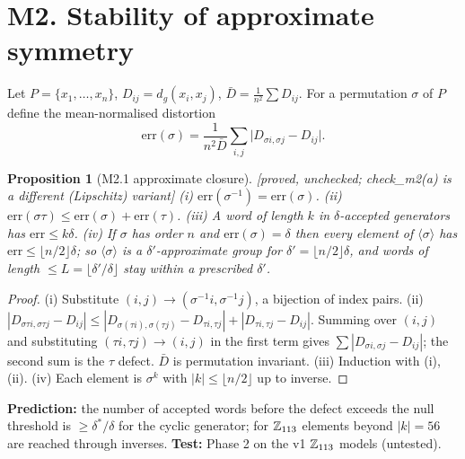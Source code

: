 \documentclass[11pt]{article}
\newtheorem{prop}{Proposition}
\theoremstyle{remark}\newtheorem{rem}{Remark}
\newcommand{\status}[1]{\hfill\textsf{[#1]}}
\begin{document}
\section*{M2. Stability of approximate symmetry}
Let $P=\{x_1,\dots,x_n\}$, $D_{ij}=d_g(x_i,x_j)$, $\bar D=\frac1{n^2}\sum D_{ij}$. For a permutation $\sigma$ of $P$ define the mean-normalised distortion
\[ \mathrm{err}(\sigma)=\frac{1}{n^2\bar D}\sum_{i,j}\bigl|D_{\sigma i,\sigma j}-D_{ij}\bigr|. \]
\begin{prop}[M2.1 approximate closure]\status{proved, unchecked; check\_m2(a) is a different (Lipschitz) variant}
(i) $\mathrm{err}(\sigma^{-1})=\mathrm{err}(\sigma)$. (ii) $\mathrm{err}(\sigma\tau)\le\mathrm{err}(\sigma)+\mathrm{err}(\tau)$. (iii) A word of length $k$ in $\delta$-accepted generators has $\mathrm{err}\le k\delta$. (iv) If $\sigma$ has order $n$ and $\mathrm{err}(\sigma)=\delta$ then every element of $\langle\sigma\rangle$ has $\mathrm{err}\le\lfloor n/2\rfloor\delta$; so $\langle\sigma\rangle$ is a $\delta'$-approximate group for $\delta'=\lfloor n/2\rfloor\delta$, and words of length $\le L=\lfloor\delta'/\delta\rfloor$ stay within a prescribed $\delta'$.
\end{prop}
\begin{proof}
(i) Substitute $(i,j)\to(\sigma^{-1}i,\sigma^{-1}j)$, a bijection of index pairs. (ii) $|D_{\sigma\tau i,\sigma\tau j}-D_{ij}|\le|D_{\sigma(\tau i),\sigma(\tau j)}-D_{\tau i,\tau j}|+|D_{\tau i,\tau j}-D_{ij}|$. Summing over $(i,j)$ and substituting $(\tau i,\tau j)\to(i,j)$ in the first term gives $\sum|D_{\sigma i,\sigma j}-D_{ij}|$; the second sum is the $\tau$ defect. $\bar D$ is permutation invariant. (iii) Induction with (i),(ii). (iv) Each element is $\sigma^k$ with $|k|\le\lfloor n/2\rfloor$ up to inverse. \qedhere
\end{proof}
\textbf{Prediction:} the number of accepted words before the defect exceeds the null threshold is $\ge\delta^*/\delta$ for the cyclic generator; for $\mathbb Z_{113}$ elements beyond $|k|=56$ are reached through inverses. \textbf{Test:} Phase 2 on the v1 $\mathbb Z_{113}$ models (untested).
\end{document}
